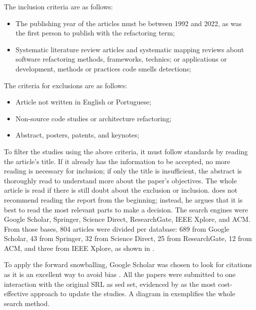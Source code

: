 The inclusion criteria are as follows:

\begin{itemize}
    \item The publishing year of the articles must be between 1992 and 2022, as \textcite{Opdyke1992} was the first person to publish with the refactoring term;
    \item Systematic literature review articles and systematic mapping reviews about software refactoring methods, frameworks, technics; or applications or development, methods or practices code smells detections;
\end{itemize}

The criteria for exclusions are as follows:

\begin{itemize}
    \item Article not written in English or Portuguese;
    \item Non-source code studies or architecture refactoring;
    \item Abstract, posters, patents, and keynotes;
\end{itemize}

To filter the studies using the above criteria, it must follow standards by reading the article's title. If it already has the information to be accepted, no more reading is necessary for inclusion; if only the title is insufficient, the abstract is thoroughly read to understand more about the paper's objectives. The whole article is read if there is still doubt about the exclusion or inclusion. \textcite{Wohlin2014} does not recommend reading the report from the beginning; instead, he argues that it is best to read the most relevant parts to make a decision.
The search engines were Google Scholar, Springer, Science Direct, ResearchGate, IEEE Xplore, and ACM. From those bases, 804 articles were divided per database: 689 from Google Scholar, 43 from Springer, 32 from Science Direct, 25 from ResearchGate, 12 from ACM, and three from IEEE Xplore, as shown in .

To apply the forward snowballing, Google Scholar was chosen to look for citations as it is an excellent way to avoid bias \cite{Wohlin2014}. All the papers were submitted to one interaction with the original SRL as sed set, evidenced by \textcite{Wohlin2020} as the most cost-effective approach to update the studies. A diagram in   exemplifies the whole search method. 

